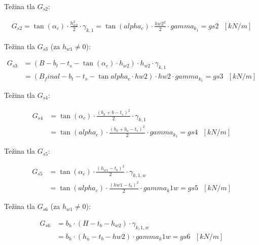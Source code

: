 \documentclass[a4paper, 11pt]{article}
\begin{document}
Te\v{z}ina tla $G_{s2}$:

\begin{align*}
G_{s2} = \tan (\alpha_{c}) \cdot \frac{h_{w2}^2}{2} \cdot \gamma_{k,1} = \tan (alpha_c) \cdot \frac{hw2^2}{2} \cdot gamma_k_1 = gs2 \text{ } [kN/m]
\end{align*}

Te\v{z}ina tla $G_{s3}$ (za $h_{w1} \neq 0$):

\begin{align*}
G_{s3} &= (B - b_{t} - t_{s} - \tan{(\alpha_{c})} \cdot h_{w2}) \cdot h_{w2} \cdot \gamma_{k,1} \\
       &= (B_final - b_t - t_s - \tan{alpha_c} \cdot hw2) \cdot hw2 \cdot gamma_k_1 = gs3 \text{ } [kN/m]
\end{align*}


Te\v{z}ina tla $G_{s4}$:

\begin{align*}
G_{s4} &= \tan{(\alpha_{c})} \cdot \frac{(b_{h} + b - t_{s})^2}{2} \cdot \gamma_{k,1} \\
	   &= \tan{(alpha_c)} \cdot \frac{(b_h + b_o - t_s)^2}{2} \cdot gamma_k_1 = gs4 \text{ } [kN/m]
\end{align*}

Te\v{z}ina tla $G_{s5}$:

\begin{align*}
G_{s5} &= \tan{(\alpha_{c})} \cdot \frac{(h_{w1} - t_{b})^2}{2} \cdot \gamma_{k,1,w} \\
       &= \tan{(alpha_c)} \cdot \frac{(hw1 - t_b)^2}{2} \cdot gamma_k1w = gs5 \text{ } [kN/m]
\end{align*}

Te\v{z}ina tla $G_{s6}$ (za $h_{w1} \neq 0$):

\begin{align*}
G_{s6} &= b_{h} \cdot (H - t_{b} - h_{w2}) \cdot \gamma_{k,1,w} \\
       &= b_h \cdot (h_u - t_b - hw2) \cdot gamma_k1w = gs6 \text{ } [kN/m]
\end{align*}

\end{document}
